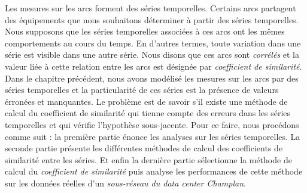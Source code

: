 Les mesures sur les arcs forment des s\'eries temporelles.
Certains arcs partagent des \'equipements que nous souhaitons d\'eterminer \`a partir des s\'eries temporelles. Nous supposons que les  s\'eries temporelles associ\'ees \`a ces arcs ont les m\^emes comportements au cours du temps. En d'autres termes, toute variation dans une s\'erie est visible dans une autre s\'erie. Nous disons que ces arcs sont {\em corr\'el\'es} et la valeur li\'ee \`a cette relation entre les arcs est d\'esign\'ee par {\em coefficient de similarit\'e}.  
\newline
Dans le chapitre pr\'ec\'edent, 
nous avons mod\'elis\'e les mesures sur les arcs par des s\'eries temporelles et la particularit\'e de ces s\'eries  est la pr\'esence de valeurs \'erron\'ees et manquantes. 
\newline
Le probl\`eme est de savoir s'il existe une m\'ethode de calcul du coefficient de similarit\'e qui tienne compte des erreurs dans les s\'eries temporelles et qui v\'erifie l'hypoth\`ese sous-jacente.
\newline
Pour ce faire, nous proc\'edons comme suit : la premi\`ere partie \'enonce  les analyses sur les s\'eries temporelles. La seconde partie pr\'esente les diff\'erentes m\'ethodes de calcul des coefficients de similarit\'e entre les s\'eries. Et enfin la derni\`ere partie s\'electionne la m\'ethode de calcul du {\em coefficient de similarit\'e} puis analyse les performances de cette m\'ethode sur les donn\'ees r\'eelles d'un {\em sous-r\'eseau du data center Champlan}.  